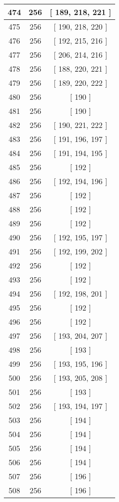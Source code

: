 \begin{center}
\begin{longtable}[H]{|| c c c ||}
\\\hline
474 & 256 & [ 189, 218, 221 ]
\\\hline
475 & 256 & [ 190, 218, 220 ]
\\\hline
476 & 256 & [ 192, 215, 216 ]
\\\hline
477 & 256 & [ 206, 214, 216 ]
\\\hline
478 & 256 & [ 188, 220, 221 ]
\\\hline
479 & 256 & [ 189, 220, 222 ]
\\\hline
480 & 256 & [ 190 ]
\\\hline
481 & 256 & [ 190 ]
\\\hline
482 & 256 & [ 190, 221, 222 ]
\\\hline
483 & 256 & [ 191, 196, 197 ]
\\\hline
484 & 256 & [ 191, 194, 195 ]
\\\hline
485 & 256 & [ 192 ]
\\\hline
486 & 256 & [ 192, 194, 196 ]
\\\hline
487 & 256 & [ 192 ]
\\\hline
488 & 256 & [ 192 ]
\\\hline
489 & 256 & [ 192 ]
\\\hline
490 & 256 & [ 192, 195, 197 ]
\\\hline
491 & 256 & [ 192, 199, 202 ]
\\\hline
492 & 256 & [ 192 ]
\\\hline
493 & 256 & [ 192 ]
\\\hline
494 & 256 & [ 192, 198, 201 ]
\\\hline
495 & 256 & [ 192 ]
\\\hline
496 & 256 & [ 192 ]
\\\hline
497 & 256 & [ 193, 204, 207 ]
\\\hline
498 & 256 & [ 193 ]
\\\hline
499 & 256 & [ 193, 195, 196 ]
\\\hline
500 & 256 & [ 193, 205, 208 ]
\\\hline
501 & 256 & [ 193 ]
\\\hline
502 & 256 & [ 193, 194, 197 ]
\\\hline
503 & 256 & [ 194 ]
\\\hline
504 & 256 & [ 194 ]
\\\hline
505 & 256 & [ 194 ]
\\\hline
506 & 256 & [ 194 ]
\\\hline
507 & 256 & [ 196 ]
\\\hline
508 & 256 & [ 196 ]
\\\hline

\end{longtable}
\end{center}
